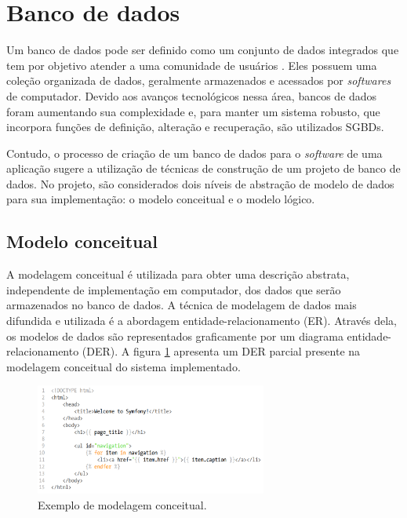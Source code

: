 \section{Banco de dados}
\label{fundBD}

Um banco de dados pode ser definido como um conjunto de dados integrados que tem por objetivo atender a uma comunidade de usuários \cite{heuser}. Eles possuem uma coleção organizada de dados, geralmente armazenados e acessados por \textit{softwares} de computador. Devido aos avanços tecnológicos nessa área, bancos de dados foram aumentando sua complexidade e, para manter um sistema robusto, que incorpora funções de definição, alteração e recuperação, são utilizados SGBDs.

Contudo, o processo de criação de um banco de dados para o \textit{software} de uma aplicação sugere a utilização de técnicas de construção de um projeto de banco de dados. No projeto, são considerados dois níveis de abstração de modelo de dados para sua implementação: o modelo conceitual e o modelo lógico.

\subsection{Modelo conceitual}
\label{fundBDModelagem}

A modelagem conceitual é utilizada para obter uma descrição abstrata, independente de implementação em computador, dos dados que serão armazenados no banco de dados. A técnica de modelagem de dados mais difundida e utilizada é a abordagem entidade-relacionamento (ER). \cite{heuser} Através dela, os modelos de dados são representados graficamente por um diagrama entidade-relacionamento (DER). A figura \ref{modelagemBDExemplol} apresenta um DER parcial presente na modelagem conceitual do sistema implementado.

\begin{figure}[h]
    \caption{Exemplo de modelagem conceitual.}
       	\begin{center}
            \includegraphics[width=0.68\textwidth]{figuras/twig-symf.png}
        \end{center}
    \label{modelagemBDExemplol}
\end{figure}

